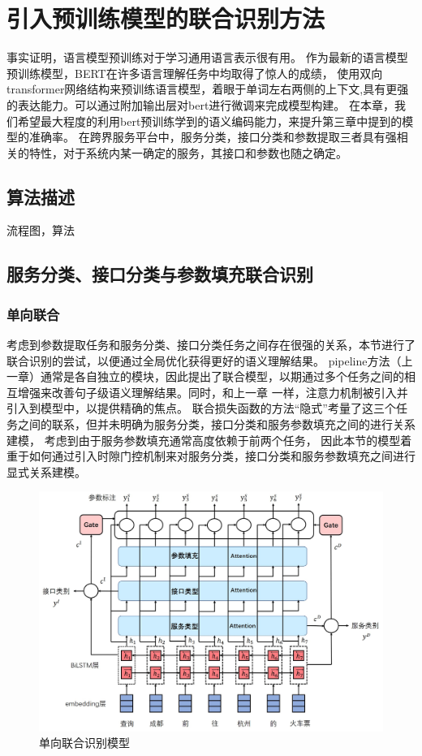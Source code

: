 \chapter{引入预训练模型的联合识别方法}

事实证明，语言模型预训练对于学习通用语言表示很有用。 作为最新的语言模型预训练模型，BERT在许多语言理解任务中均取得了惊人的成绩，
使用双向transformer网络结构来预训练语言模型，着眼于单词左右两侧的上下文,具有更强的表达能力。可以通过附加输出层对bert进行微调来完成模型构建。
在本章，我们希望最大程度的利用bert预训练学到的语义编码能力，来提升第三章中提到的模型的准确率。
在跨界服务平台中，服务分类，接口分类和参数提取三者具有强相关的特性，对于系统内某一确定的服务，其接口和参数也随之确定。

\section{算法描述}
流程图，算法

\section{服务分类、接口分类与参数填充联合识别}
\subsection{单向联合}
考虑到参数提取任务和服务分类、接口分类任务之间存在很强的关系，本节进行了联合识别的尝试，以便通过全局优化获得更好的语义理解结果。
pipeline方法（上一章）通常是各自独立的模块，因此提出了联合模型，以期通过多个任务之间的相互增强来改善句子级语义理解结果。同时，和上一章
一样，注意力机制被引入并引入到模型中，以提供精确的焦点。
联合损失函数的方法“隐式”考量了这三个任务之间的联系，但并未明确为服务分类，接口分类和服务参数填充之间的进行关系建模，
考虑到由于服务参数填充通常高度依赖于前两个任务，
因此本节的模型着重于如何通过引入时隙门控机制来对服务分类，接口分类和服务参数填充之间进行显式关系建模。

\begin{figure}[htbp]
    \centering
    \includegraphics[width=17cm]{./images/lianhe.jpg}
    \caption{单向联合识别模型}
    \label{fig:lianhe1}
  \end{figure}

